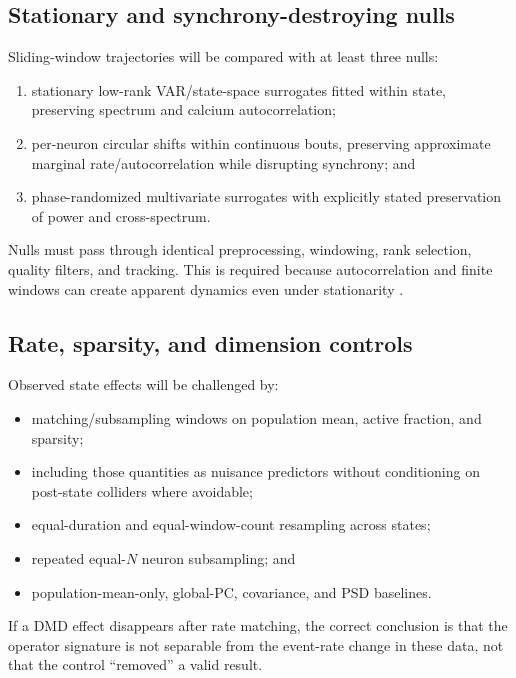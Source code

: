 \documentclass[11pt,a4paper]{article}
\begin{document}
\subsection{Stationary and synchrony-destroying nulls}

Sliding-window trajectories will be compared with at least three nulls:

\begin{enumerate}
  \item stationary low-rank VAR/state-space surrogates fitted within state, preserving spectrum and calcium autocorrelation;
  \item per-neuron circular shifts within continuous bouts, preserving approximate marginal rate/autocorrelation while disrupting synchrony; and
  \item phase-randomized multivariate surrogates with explicitly stated preservation of power and cross-spectrum.
\end{enumerate}

Nulls must pass through identical preprocessing, windowing, rank selection, quality filters, and tracking. This is required because autocorrelation and finite windows can create apparent dynamics even under stationarity \citep{leonardi2015,hindriks2016}.

\subsection{Rate, sparsity, and dimension controls}

Observed state effects will be challenged by:

\begin{itemize}
  \item matching/subsampling windows on population mean, active fraction, and sparsity;
  \item including those quantities as nuisance predictors without conditioning on post-state colliders where avoidable;
  \item equal-duration and equal-window-count resampling across states;
  \item repeated equal-$N$ neuron subsampling; and
  \item population-mean-only, global-PC, covariance, and PSD baselines.
\end{itemize}

If a DMD effect disappears after rate matching, the correct conclusion is that the operator signature is not separable from the event-rate change in these data, not that the control ``removed'' a valid result.
\end{document}
